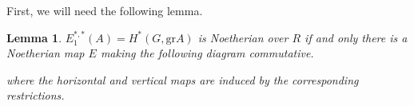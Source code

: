 \documentclass{article}
\theoremstyle{plain}
\newtheorem{Lemma}[Th]{Lemma}
\theoremstyle{definition}
\begin{document}
First, we will need the following lemma. 

\begin{Lemma}
    $E^{\ast,\ast}_1(A)=H^\ast(G,\mathrm{gr}A)$ is Noetherian over $R$ if and only there is a Noetherian map $E$ making the following diagram commutative. 
\begin{center}
    \end{center}
    \noindent where the horizontal and vertical maps are induced by the corresponding restrictions. 
\end{Lemma}
\end{document}
